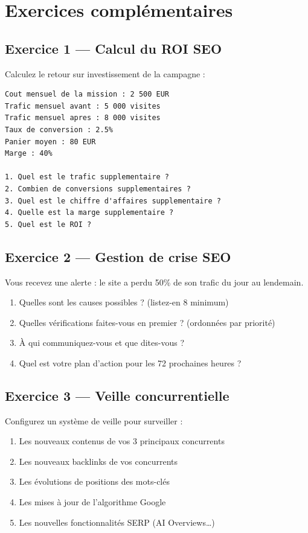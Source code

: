 \documentclass[12pt,a4paper]{report}
\begin{document}
\section{Exercices complémentaires}

\subsection{Exercice 1 --- Calcul du ROI SEO}
Calculez le retour sur investissement de la campagne :

\begin{lstlisting}
Cout mensuel de la mission : 2 500 EUR
Trafic mensuel avant : 5 000 visites
Trafic mensuel apres : 8 000 visites
Taux de conversion : 2.5%
Panier moyen : 80 EUR
Marge : 40%

1. Quel est le trafic supplementaire ?
2. Combien de conversions supplementaires ?
3. Quel est le chiffre d'affaires supplementaire ?
4. Quelle est la marge supplementaire ?
5. Quel est le ROI ?
\end{lstlisting}

\subsection{Exercice 2 --- Gestion de crise SEO}
Vous recevez une alerte : le site a perdu 50\% de son trafic du jour au lendemain.

\begin{enumerate}
\item Quelles sont les causes possibles ? (listez-en 8 minimum)
\item Quelles vérifications faites-vous en premier ? (ordonnées par priorité)
\item À qui communiquez-vous et que dites-vous ?
\item Quel est votre plan d'action pour les 72 prochaines heures ?
\end{enumerate}

\subsection{Exercice 3 --- Veille concurrentielle}
Configurez un système de veille pour surveiller :

\begin{enumerate}
\item Les nouveaux contenus de vos 3 principaux concurrents
\item Les nouveaux backlinks de vos concurrents
\item Les évolutions de positions des mots-clés
\item Les mises à jour de l'algorithme Google
\item Les nouvelles fonctionnalités SERP (AI Overviews\ldots)
\end{enumerate}
\end{document}
